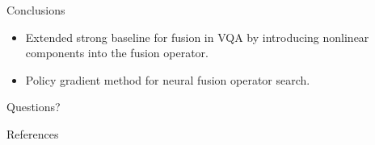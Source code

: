 \documentclass{beamer}
\begin{document}
\begin{frame}[fragile]{Conclusions}
        \begin{itemize}[<+- | alert@+>]
                \item Extended strong baseline for fusion in VQA by introducing
                        nonlinear components into the fusion operator.

                \item Policy gradient method for neural fusion operator search.



        \end{itemize}
\end{frame}

\begin{frame}[standout]
        Questions?
\end{frame}

\appendix

\begin{frame}[allowframebreaks]{References}
        
        
\end{frame}
\end{document}
